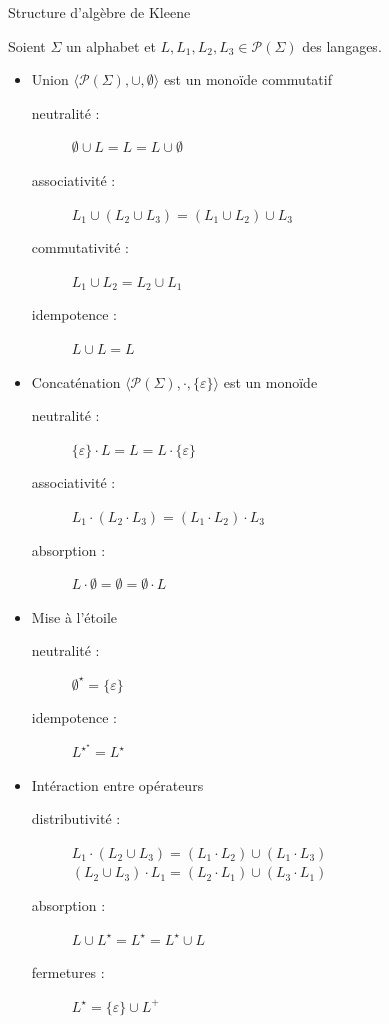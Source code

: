 
\begingroup

\begin{frame}{Structure d'algèbre de Kleene}

  Soient $\Sigma$ un alphabet et $L, L_1, L_2, L_3 \in \mathscr{P}(\Sigma)$ des langages. 
  
  \begin{itemize}
  \item Union \hspace{\fill} $\langle \mathscr{P}(\Sigma), \cup, \emptyset \rangle$ est un monoïde commutatif
    \begin{description}
    \item[neutralité :] $\emptyset \cup L = L = L \cup \emptyset$ 
    \item[associativité :] $L_1 \cup (L_2 \cup L_3) = (L_1 \cup L_2) \cup L_3$
    \item[commutativité :] $L_1 \cup L_2 = L_2 \cup L_1$
    \item[idempotence :] $L \cup L = L$
    \end{description}
  \item Concaténation \hspace{\fill} $\langle \mathscr{P}(\Sigma), \cdot, \{\varepsilon\} \rangle$ est un monoïde
    \begin{description}
    \item[neutralité :] $\{\varepsilon\} \cdot L = L = L \cdot \{\varepsilon\}$
    \item[associativité :] $L_1 \cdot (L_2 \cdot L_3) = (L_1 \cdot L_2) \cdot L_3$
    \item[absorption :] $L \cdot \emptyset = \emptyset = \emptyset \cdot L$
    \end{description}
  \item Mise à l'étoile
    \begin{description}
    \item[neutralité :] $\emptyset^\star = \{\varepsilon\}$
    \item[idempotence :] $L^{\star^\star} = L^\star$
    \end{description}
  \item Intéraction entre opérateurs 
    \begin{description}
    \item[distributivité :] $L_1 \cdot (L_2 \cup L_3) = (L_1\cdot L_2) \cup (L_1 \cdot L_3)$\\
      $(L_2 \cup L_3) \cdot L_1 = (L_2\cdot L_1) \cup (L_3 \cdot L_1)$
    \item[absorption :] $L \cup L^\star = L^\star = L^\star \cup L$
    \item[fermetures :] $L^\star = \{ \varepsilon \} \cup L^+$
    \end{description}
  \end{itemize}

\end{frame}

\endgroup
\endinput
